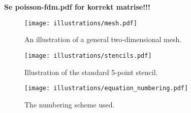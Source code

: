 {\Huge \textbf{Se poisson-fdm.pdf for korrekt matrise!!!}}


\begin{figure}[htbp]
  \centering
  \texttt{[image: illustrations/mesh.pdf]}
  \caption{An illustration of a general two-dimensional mesh.}
  \label{fig:mesh}
\end{figure}

\begin{figure}[htbp]
  \centering
  \texttt{[image: illustrations/stencils.pdf]}
  \caption{Illustration of the standard 5-point stencil.}
  \label{fig:stencil}
\end{figure}

\begin{figure}[htbp]
  \centering
  \texttt{[image: illustrations/equation\_numbering.pdf]}
  \caption{The numbering scheme used.}
  \label{fig:numbering_scheme}
\end{figure}



